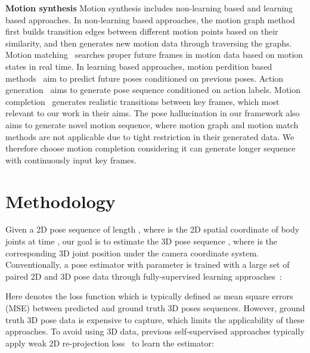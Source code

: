 \documentclass[10pt,twocolumn,letterpaper]{article}
\begin{document}
\noindent \textbf {Motion synthesis}
Motion synthesis includes non-learning based and learning based approaches.
In non-learning based approaches,
the motion graph method~\cite{kovar2008motion} first builds transition edges between different motion points based on their similarity, and then generates new motion data through traversing the graphs. Motion matching~\cite{buttner2015motion} searches proper future frames in motion data based on motion states in real time.
In learning based approaches,
motion perdition based methods~\cite{martinez2017human, zhang2020we, li2018convolutional, gui2018adversarial, barsoum2018hp, yuan2020dlow, pavllo2018quaternet} aim to predict future poses conditioned on previous poses.  Action generation~\cite{wang2020learning, butepage2017deep, battan2021glocalnet} aims to generate pose sequence conditioned on action labels.
Motion completion~\cite{hernandez2019human, kaufmann2020convolutional, holden2016deep, duan2021ssmc, harvey2018recurrent, harvey2020robust}  generates realistic transitions between key frames, which most relevant to our work in their aims.  The pose hallucination in our framework also aims  to generate novel motion sequence, where motion graph and motion match methods are not applicable due to tight restriction in their generated data. 
We therefore choose motion completion considering it can  generate longer sequence with continuously input key frames.
%
 \section{Methodology}
Given a 2D pose sequence  of length , where  is the 2D spatial coordinate of  body joints at time , our goal is to estimate the 3D pose sequence , where  is the corresponding 3D joint position under the camera coordinate system.
Conventionally, a pose estimator  with parameter  is trained with a large set of paired 2D and 3D pose data  through fully-supervised learning approaches~\cite{martinez2017simple,mehta2017vnect,sun2018integral,kocabas2020vibe, pavllo2019videopose3d}:

Here  denotes the loss function which is typically
defined as mean square errors (MSE) between predicted and ground truth 3D poses sequences.
However, ground truth 3D pose data is expensive to capture, which limits the applicability of these approaches. 
To avoid using 3D data, previous self-supervised approaches typically apply weak 2D re-projection loss~\cite{drover2018can, chen2019unsupervised, yu2021towards, hu2021unsupervised} to learn the estimator:
\end{document}
